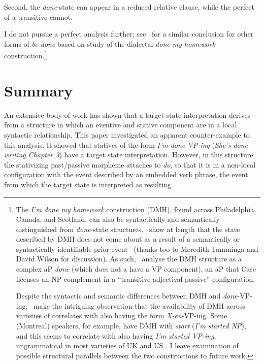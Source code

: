 \documentclass[output=paper]{langsci/langscibook}
\begin{document}
Second, the \emph{done}-state can appear in a reduced relative clause, while the perfect of a transitive cannot.


\begin{exe}
\ex
\begin{xlist}
\end{xlist}
\end{exe}

I do not pursue a perfect analysis further; see~\cite{Fruehwald2015a} for a
similar conclusion for other forms of \emph{be done} based on study of the
dialectal \emph{done my homework} construction.\footnote{The \emph{I'm done my
    homework} construction (\gls{DMH}), found across
    Philadelphia, Canada, and Scotland, can also be syntactically and
    semantically distinguished from \emph{done}-state
    structures.~\cite{Fruehwald2015a} show at length that the state described
    by \gls{DMH} does not come about as a result of a semantically or
    syntactically identifiable prior event~\citep[154--157]{Fruehwald2015a}
    (thanks too to Meredith Tamminga and David Wilson for discussion). As
    such,~\cite{Fruehwald2015a} analyse the \gls{DMH} structure as a complex aP
    \emph{done} (which does not a have a VP component), an aP that Case
    licenses an NP complement in a \enquote{transitive adjectival passive}
    configuration.

Despite the syntactic and semantic differences between \gls{DMH} and
\emph{done}-VP-ing,~\cite{Fruehwald2015a} make the intriguing observation that
the availability of DMH across varieties of  correlates with also having
the form \emph{X-en}-VP-ing. Some (Montreal) speakers, for example, have DMH
with \emph{start} (\emph{I'm started NP}), and this seems to correlate with
also having \emph{I'm started VP-ing}, ungrammatical in most varieties of UK
and US . I leave examination of possible structural parallels between
the two constructions to future work.}

\section{Summary}\label{summary}\largerpage

An extensive body of work has shown that a target state interpretation derives
from a structure in which an eventive and stative component are in a local
syntactic relationship. This paper investigated an apparent counter-example to
this analysis. It showed that statives of the form \emph{I'm done VP-ing}
(\emph{She's done writing Chapter 3}) have a target state interpretation.
However, in this structure the stativizing past/passive morpheme attaches to
\emph{do}, so that it is in a non-local configuration with the event described
by an embedded verb phrase, the event from which the target state is
interpreted as resulting.
\end{document}
